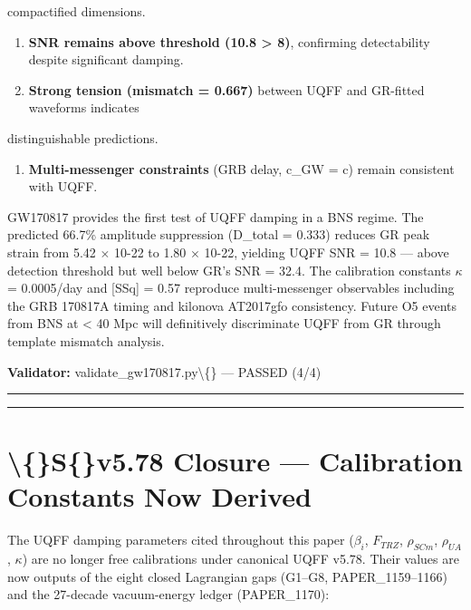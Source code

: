\documentclass[11pt]{article}
\begin{document}
compactified dimensions.

\begin{enumerate}
  \item \textbf{SNR remains above threshold (10.8 > 8)}, confirming detectability despite significant damping.
  \item \textbf{Strong tension (mismatch = 0.667)} between UQFF and GR-fitted waveforms indicates
\end{enumerate}

distinguishable predictions.

\begin{enumerate}
  \item \textbf{Multi-messenger constraints} (GRB delay, c\_GW = c) remain consistent with UQFF.
\end{enumerate}

GW170817 provides the first test of UQFF damping in a BNS regime. The predicted 66.7\% amplitude suppression (D\_total = 0.333) reduces GR peak strain from 5.42 $\times$ 10-22 to 1.80 $\times$ 10-22, yielding UQFF SNR = 10.8 --- above detection threshold but well below GR's SNR = 32.4. The calibration constants $\kappa$ = 0.0005/day and [SSq] = 0.57 reproduce multi-messenger observables including the GRB 170817A timing and kilonova AT2017gfo consistency. Future O5 events from BNS at < 40 Mpc will definitively discriminate UQFF from GR through template mismatch analysis.

\textbf{Validator:} validate\_gw170817.py\textbackslash\{\} --- PASSED (4/4)

\noindent\rule{\textwidth}{0.4pt}

\noindent\rule{\textwidth}{0.4pt}

\section*{\textbackslash\{\}S\{\}v5.78 Closure --- Calibration Constants Now Derived}

The UQFF damping parameters cited throughout this paper ($\beta_i$, $F_{TRZ}$, $\rho_{SCm}$, $\rho_{UA}$, $\kappa$) are no longer free calibrations under canonical UQFF v5.78. Their values are now outputs of the eight closed Lagrangian gaps (G1--G8, PAPER\_1159--1166) and the 27-decade vacuum-energy ledger (PAPER\_1170):
\end{document}
